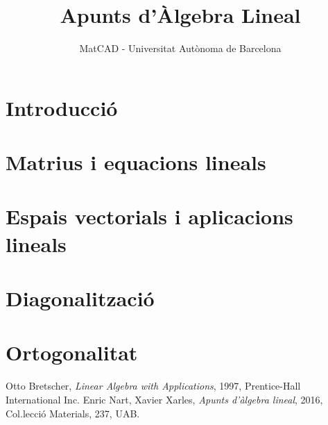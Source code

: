 \documentclass[a4paper,12pt,twoside]{article}
\title{Apunts d'Àlgebra Lineal}
\author{MatCAD - Universitat Autònoma de Barcelona}
\renewcommand{\1}{\mathbf{1}}
\newcommand{\0}{\mathbf{0}}
\theoremstyle{definition}
\theoremstyle{remark}
\begin{document}
\maketitle
\tableofcontents
\newpage
\section*{Introducció}
{

}
\section{Matrius i equacions lineals}
{

}
\section{Espais vectorials i aplicacions lineals}
{

}
\section{Diagonalització}
{

}
\section{Ortogonalitat}
{

}
%

\printindex
\begin{thebibliography}{20}
	Otto Bretscher,
	\textit{Linear Algebra with Applications},
	1997, Prentice-Hall International Inc.
	Enric Nart, Xavier Xarles,
	\textit{Apunts d'àlgebra lineal}, 2016, Col.lecci\'o Materials, 237, UAB.
\end{thebibliography}
\end{document}
